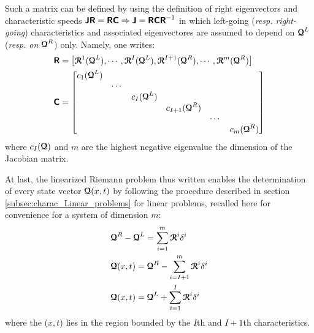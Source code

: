 Such a matrix can be defined by using the definition of right eigenvectors and characteristic speeds $\boldsymbol{\mathsf{J}} \boldsymbol{\mathsf{R}} = \boldsymbol{\mathsf{R}} \boldsymbol{\mathsf{C}} \Rightarrow \boldsymbol{\mathsf{J}} = \boldsymbol{\mathsf{R}} \boldsymbol{\mathsf{C}} \boldsymbol{\mathsf{R}}^{-1}$ in which left-going (\textit{resp. right-going}) characteristics and associated eigenvectores are assumed to depend on ${\boldsymbol{\mathcal{Q}}}^L$ (\textit{resp. on} ${\boldsymbol{\mathcal{Q}}}^R$) only. Namely, one writes:
\begin{align*}
  &\boldsymbol{\mathsf{R}} = \left[\begin{matrix}{\boldsymbol{\mathcal{R}}}^1({\boldsymbol{\mathcal{Q}}}^L),\cdots,{\boldsymbol{\mathcal{R}}}^I({\boldsymbol{\mathcal{Q}}}^L),{\boldsymbol{\mathcal{R}}}^{I+1}({\boldsymbol{\mathcal{Q}}}^R),\cdots,{\boldsymbol{\mathcal{R}}}^m({\boldsymbol{\mathcal{Q}}}^R)\end{matrix}\right] \\
  &\boldsymbol{\mathsf{C}}=\left[\begin{matrix}c_1({\boldsymbol{\mathcal{Q}}}^L) & & & & & \\ & \cdots & & && \\ & &c_I({\boldsymbol{\mathcal{Q}}}^L) & & &\\ & & &c_{I+1}({\boldsymbol{\mathcal{Q}}}^R)& & \\ & & & &\cdots &\\ &&&&&c_m({\boldsymbol{\mathcal{Q}}}^R)\end{matrix}\right] 
\end{align*}
where $c_I({\boldsymbol{\mathcal{Q}}})$ and $m$ are the highest negative eigenvalue the dimension of the Jacobian matrix. %

At last, the linearized Riemann problem thus written enables the determination of every state vector ${\boldsymbol{\mathcal{Q}}}(x,t)$ by following the procedure described in section \ref{subsec:charac_Linear_problems} for linear problems, recalled here for convenience for a system of dimension $m$:%
\begin{equation}
  \label{eq:approx_RS}
  \begin{aligned}
    &  \Qcb^R-\Qcb^L=\sum_{i=1}^{m} \Rcb^i\delta^i \\
    &  \Qcb(x,t) =\Qcb^R -\sum_{i=I+1}^{m} \Rcb^i\delta^i \\
    &  \Qcb(x,t) =\Qcb^L+ \sum_{i=1}^{I} \Rcb^i\delta^i
  \end{aligned}
\end{equation}
where the ($x,t$) lies in the region bounded by the $I$th and $I+1$th characteristics.

